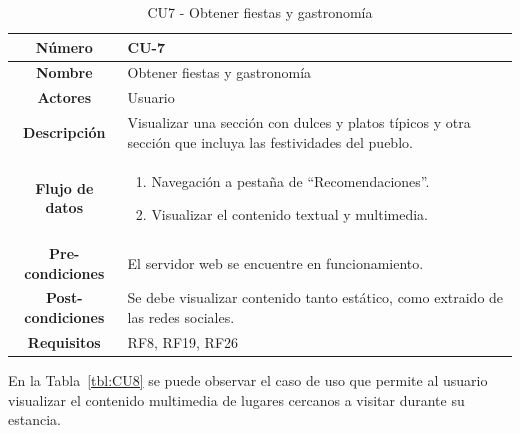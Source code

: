 \begin{table}[h!tb]
	\centering
	\begin{adjustbox}{width=1\textwidth}
	\begin{tabular}{|c|p{\textwidth}|}
		\hline {\bf Número} & CU-7 \\
		\hline {\bf Nombre} & Obtener fiestas y gastronomía\\
		\hline {\bf Actores} & Usuario \\
		\hline {\bf Descripción} & Visualizar una sección con dulces y platos típicos y otra sección que incluya las festividades del pueblo. \\
		\hline {\bf Flujo de datos}
		& 
		\begin{enumerate}
			\item Navegación a pestaña de ``Recomendaciones''.
            \item Visualizar el contenido textual y multimedia.
   
        \end{enumerate}\\
		\hline {\bf Pre-condiciones}
		& El servidor web se encuentre en funcionamiento. \\
		\hline {\bf Post-condiciones}
		& Se debe visualizar contenido tanto estático, como extraido de las redes sociales. \\
    
		\hline {\bf Requisitos} & RF8, RF19, RF26 \\
		\hline 
	\end{tabular}
	\end{adjustbox}
	\caption{CU7 - Obtener fiestas y gastronomía\label{tbl:CU7}}
\end{table}
En la Tabla~\ref{tbl:CU8} se puede observar el caso de uso que permite al usuario visualizar el contenido multimedia de lugares cercanos a visitar durante su estancia. 
